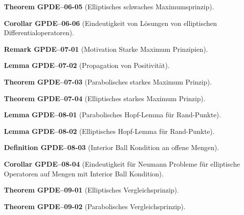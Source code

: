 \documentclass[10pt, letterpaper]{article}
\newcommand{\CustomHeading}[3]{%
  \par\medskip\noindent%
  \textbf{#1 #2} \textnormal{(#3)}.\enskip%
}
\newenvironment{DEF}[2]{\CustomHeading{Definition}{#1}{#2}}{}
\newenvironment{THEO}[2]{\CustomHeading{Theorem}{#1}{#2}}{}
\newenvironment{LEM}[2]{\CustomHeading{Lemma}{#1}{#2}}{}
\newenvironment{KORO}[2]{\CustomHeading{Corollar}{#1}{#2}}{}
\newenvironment{REM}[2]{\CustomHeading{Remark}{#1}{#2}}{}
\begin{document}
\begin{THEO}{GPDE--06-05}{Elliptisches schwaches Maximumsprinzip}
\end{THEO}

\begin{KORO}{GPDE--06-06}{Eindeutigkeit von Lösungen von elliptischen Differentialoperatoren}
\end{KORO}

\begin{REM}{GPDE--07-01}{Motivation Starke Maximum Prinzipien}
\end{REM}

\begin{LEM}{GPDE--07-02}{Propagation von Positivität}
\end{LEM}

\begin{THEO}{GPDE--07-03}{Parabolisches starkes Maximum Prinzip}
\end{THEO}

\begin{THEO}{GPDE--07-04}{Elliptisches starkes Maximum Prinzip}
\end{THEO}

\begin{LEM}{GPDE--08-01}{Parabolisches Hopf-Lemma für Rand-Punkte}
\end{LEM}

\begin{LEM}{GPDE--08-02}{Elliptisches Hopf-Lemma für Rand-Punkte}
\end{LEM}

\begin{DEF}{GPDE--08-03}{Interior Ball Kondition an offene Mengen}
\end{DEF}

\begin{KORO}{GPDE--08-04}{Eindeutigkeit für Neumann Probleme für elliptische Operatoren auf Mengen mit Interior Ball Kondition}
\end{KORO}

\begin{THEO}{GPDE--09-01}{Elliptisches Vergleichsprinzip}
\end{THEO}

\begin{THEO}{GPDE--09-02}{Parabolisches Vergleichsprinzip}
\end{THEO}
\end{document}
